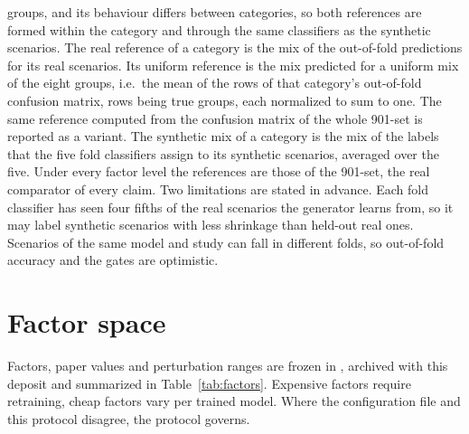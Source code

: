 \documentclass[11pt,a4paper]{article}
\begin{document}
\begin{description}[style=nextline]
{  groups, and its behaviour differs between categories, so both references
  are formed within the category and through the same classifiers as the
  synthetic scenarios. The real reference of a category is the mix of the
  out-of-fold predictions for its real scenarios. Its uniform reference is
  the mix predicted for a uniform mix of the eight groups, i.e.\ the mean
  of the rows of that category's out-of-fold confusion matrix, rows being
  true groups, each normalized to sum to one. The same reference computed
  from the confusion matrix of the whole 901-set is reported as a variant.
  The synthetic mix of a category is the mix of the labels that the five
  fold classifiers assign to its synthetic scenarios, averaged over the
  five. Under every factor level the references are those of the 901-set,
  the real comparator of every claim. Two limitations are stated in
  advance. Each fold classifier has seen four fifths of the real scenarios
  the generator learns from, so it may label synthetic scenarios with less
  shrinkage than held-out real ones. Scenarios of the same model and study
  can fall in different folds, so out-of-fold accuracy and the gates are
  optimistic.}
\end{description}

\section{Factor space}\label{sec:factors}
Factors, paper values and perturbation ranges are frozen in
, archived with this deposit and summarized
in Table~\ref{tab:factors}. Expensive factors require retraining, cheap
factors vary per trained model. Where the configuration file and this
protocol disagree, the protocol governs.
\end{document}
